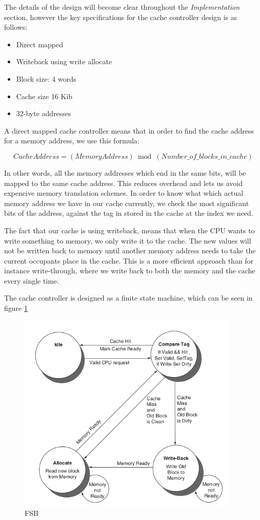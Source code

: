 \documentclass{article}
\begin{document}
The details of the design will become clear throughout the \textit{Implementation} section, however the key specifications for the cache controller design is as follows:
\begin{itemize}
  \item{Direct mapped}
  \item{Writeback using write allocate}
  \item{Block size: 4 words}
  \item{Cache size 16 Kib}
  \item{32-byte addresses}
\end{itemize}

A direct mapped cache controller means that in order to find the cache address for a memory address, we use this formula:

\begin{equation*}
  CacheAddress = (MemoryAddress) \bmod (Number\_of\_blocks\_in\_cache)
\end{equation*}

In other words, all the memory addresses which end in the same bits, will be mapped to the same cache address. This reduces overhead and lets us avoid expencive memory translation schemes. In order to know what which actual memory address we have in our cache currently, we check the most significant bits of the address, against the tag in stored in the cache at the index we need.

The fact that our cache is using writeback, means that when the CPU wants to write something to memory, we only write it to the cache. The new values will not be written back to memory until another memory address needs to take the current occupants place in the cache. This is a more efficient approach than for instance write-through, where we write back to both the memory and the cache every single time. 

The cache controller is designed as a finite state machine, which can be seen in figure \ref{FSB}


\begin{figure}[H]
 \centering
  \includegraphics[width=300pt]{img/FSB.png}
  \caption{FSB\cite{BOOK}}
  \label{FSB}
 \end{figure}
\end{document}
